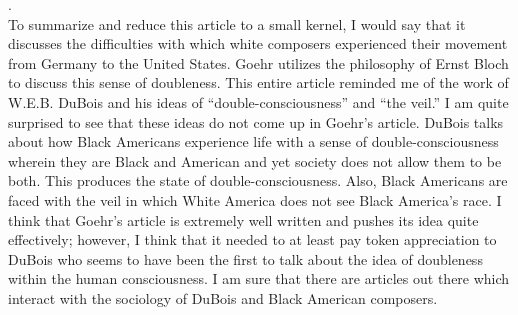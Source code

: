 \documentclass[12pt]{article}
\begin{document}
\noindent {}.\\

To summarize and reduce this article to a small kernel, I would say that it
discusses the difficulties with which white composers experienced their
movement from Germany to the United States. Goehr utilizes the philosophy of
Ernst Bloch to discuss this sense of doubleness. This entire article reminded
me of the work of W.E.B. DuBois and his ideas of ``double-consciousness'' and
``the veil.'' I am quite surprised to see that these ideas do not come up in
Goehr's article. DuBois talks about how Black Americans experience life with a
sense of double-consciousness wherein they are Black and American and yet
society does not allow them to be both. This produces the state of
double-consciousness. Also, Black Americans are faced with the veil in which
White America does not see Black America's race. I think that Goehr's article
is extremely well written and pushes its idea quite effectively; however, I
think that it needed to at least pay token appreciation to DuBois who seems to
have been the first to talk about the idea of doubleness within the human
consciousness. I am sure that there are articles out there which interact with
the sociology of DuBois and Black American composers. 
\end{document}
